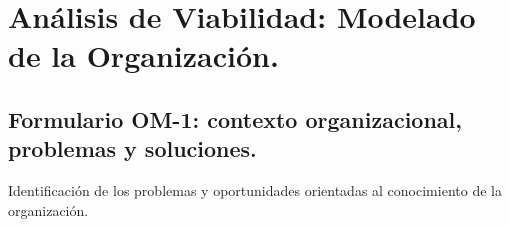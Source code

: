 \documentclass[12pt,a4paper,twoside,spanish]{article}      %
\begin{document}

 \pagestyle{myheadings} 

\setlength{\parindent}{1,5cm} \setlength{\parskip}{0,7cm}


\section{Análisis de Viabilidad: Modelado de la Organización.}



\subsection{Formulario OM-1: contexto organizacional, problemas y soluciones.}

Identificación de los problemas y oportunidades orientadas al conocimiento de la organización.
\end{document}
